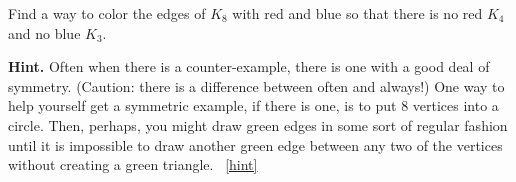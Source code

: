 \documentclass{book}
\begin{document}
\setcounter{project}{50}
\addtocounter{project}{-1}
\begin{activity}[]\label{activity-43}
\hypertarget{p-429}{}%
Find a way to color the edges of \(K_8\) with red and blue so that there is no red \(K_4\) and no blue \(K_3\).%
\par\smallskip%
\noindent\textbf{Hint.}\hypertarget{hint-20}{}\quad%
\hypertarget{p-430}{}%
Often when there is a counter-example, there is one with a good deal of symmetry. (Caution: there is a difference between often and always!) One way to help yourself get a symmetric example, if there is one, is to put 8 vertices into a circle. Then, perhaps, you might draw green edges in some sort of regular fashion until it is impossible to draw another green edge between any two of the vertices without creating a green triangle.%
~\hfill{\tiny\hyperlink{a-50}{[hint]}\hypertarget{q-50}{}}\end{activity}

\clearpage
\end{document}
